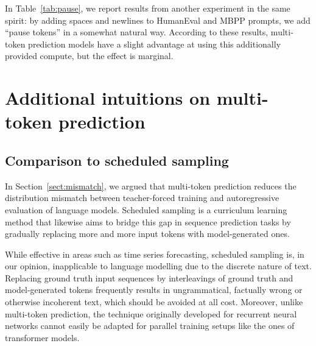 In Table~\ref{tab:pause}, we report results from another experiment in the same spirit: by adding spaces and newlines to HumanEval and MBPP prompts, we add ``pause tokens'' in a somewhat natural way. According to these results, multi-token prediction models have a slight advantage at using this additionally provided compute, but the effect is marginal. 






\newpage


\section{Additional intuitions on multi-token prediction}
\label{app:intuitions}

\subsection{Comparison to scheduled sampling}
In Section~\ref{sect:mismatch}, we argued that multi-token prediction reduces the distribution mismatch between teacher-forced training and autoregressive evaluation of language models. Scheduled sampling \citep{bengio2015scheduled} is a curriculum learning method that likewise aims to bridge this gap in sequence prediction tasks by gradually replacing more and more input tokens with model-generated ones.

While effective in areas such as time series forecasting, scheduled sampling is, in our opinion, inapplicable to language modelling due to the discrete nature of text. Replacing ground truth input sequences by interleavings of ground truth and model-generated tokens frequently results in ungrammatical, factually wrong or otherwise incoherent text, which should be avoided at all cost. Moreover, unlike multi-token prediction, the technique originally developed for recurrent neural networks cannot easily be adapted for parallel training setups like the ones of transformer models.

